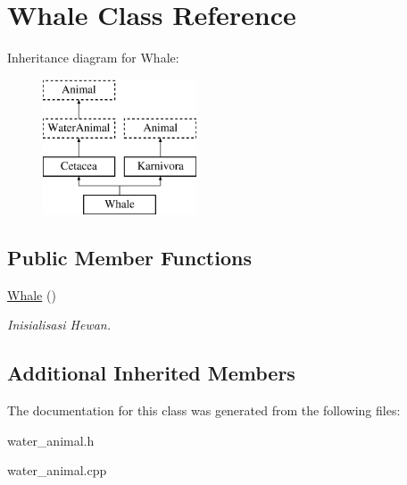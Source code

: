 \hypertarget{class_whale}{}\section{Whale Class Reference}
\label{class_whale}
Inheritance diagram for Whale\+:\begin{figure}[H]
\begin{center}
\leavevmode
\includegraphics[height=4.000000cm]{class_whale}
\end{center}
\end{figure}
\subsection*{Public Member Functions}
\begin{DoxyCompactItemize}
\item 
\hyperlink{class_whale_a1a3ee57b92f6fb72ccf0fa12ea118cd7}{Whale} ()\hypertarget{class_whale_a1a3ee57b92f6fb72ccf0fa12ea118cd7}{}\label{class_whale_a1a3ee57b92f6fb72ccf0fa12ea118cd7}

\begin{DoxyCompactList}\small\item\em Inisialisasi Hewan. \end{DoxyCompactList}\end{DoxyCompactItemize}
\subsection*{Additional Inherited Members}


The documentation for this class was generated from the following files\+:\begin{DoxyCompactItemize}
\item 
water\+\_\+animal.\+h\item 
water\+\_\+animal.\+cpp\end{DoxyCompactItemize}
